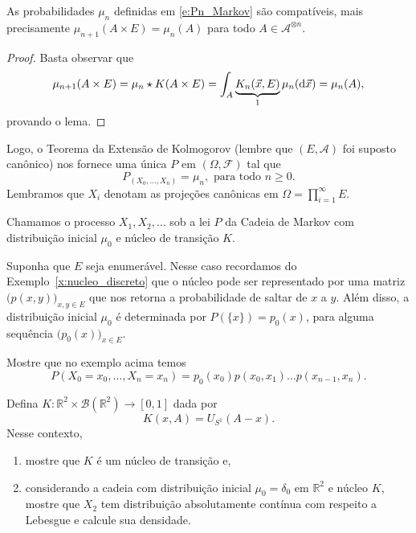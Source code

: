 \begin{lemma}
  As probabilidades $\mu_n$ definidas em \eqref{e:Pn_Markov} são compatíveis, mais precisamente $\mu_{n+1}(A \times E) = \mu_n(A)$ para todo $A \in \mathcal{A}^{\otimes n}$.
\end{lemma}

\begin{proof}
  Basta observar que
  \begin{equation}
    \mu_{n+1}(A \times E) = \mu_n \star K (A \times E) = \int_{A} \underbrace{K_n (\vec{x}, E)}_1 \mu_n(\mathop{}\!\mathrm{d} \vec{x}) = \mu_n(A),
  \end{equation}
  provando o lema.
\end{proof}

Logo, o Teorema da Extensão de Kolmogorov (lembre que $(E, \mathcal{A})$ foi suposto canônico) nos fornece uma única $P$ em $(\Omega, \mathcal{F})$ tal que
\begin{equation}
   P_{(X_0, \dots, X_n)} = \mu_n, \text{ para todo $n \geq 0$}.
\end{equation}
Lembramos que $X_i$ denotam as projeções canônicas em $\Omega = \prod_{i=1}^\infty E$.

Chamamos o processo $X_1, X_2, \dots$ sob a lei $P$ da Cadeia de Markov  com distribuição inicial $\mu_0$ e núcleo de transição $K$.

\begin{example}
  \label{x:Markov_p_xy}
  Suponha que $E$ seja enumerável.
  Nesse caso recordamos do Exemplo~\ref{x:nucleo_discreto} que o núcleo pode ser representado por uma matriz $\big(p(x,y)\big)_{x,y \in E}$ que nos retorna a probabilidade de saltar de $x$ a $y$.
  Além disso, a distribuição inicial $\mu_0$ é determinada por $P(\{x\}) = p_0(x)$, para alguma sequência $\big(p_0(x)\big)_{x \in E}$.
\end{example}

\begin{exercise}
  Mostre que no exemplo acima temos
  \begin{equation}
    P(X_0 = x_0, \dots, X_n = x_n) = p_0(x_0) p(x_0, x_1) \dots p(x_{n-1}, x_n).
  \end{equation}
\end{exercise}

\begin{exercise}
  Defina $K:\mathbb{R}^2 \times \mathcal{B}(\mathbb{R}^2) \to [0,1]$ dada por
  \begin{equation}
    K(x, A) = U_{S^1}(A - x).
  \end{equation}
  Nesse contexto,
  \begin{enumerate}[\quad a)]
  \item mostre que $K$ é um núcleo de transição e,
  \item considerando a cadeia com distribuição inicial $\mu_0 = \delta_0$ em $\mathbb{R}^2$ e núcleo $K$, mostre que $X_2$ tem distribuição absolutamente contínua com respeito a Lebesgue e calcule sua densidade.
  \end{enumerate}
\end{exercise}

